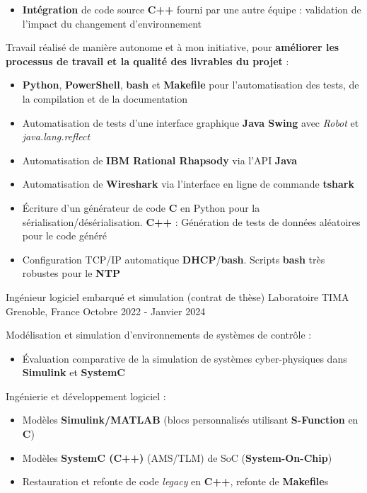 \begin{cventries}
{\begin{cvitems}
{\begin{itemize}
				\item{\textbf{Intégration} de code source \textbf{C++} fourni par une autre équipe : validation de l'impact du changement d'environnement}
			\end{itemize}
		}
		\item{
			Travail réalisé de manière autonome et à mon initiative, pour \textbf{améliorer les processus de travail et la qualité des livrables du projet} :
			\begin{itemize}
				\item{\textbf{Python}, \textbf{PowerShell}, \textbf{bash} et \textbf{Makefile} pour l'automatisation des tests, de la compilation et de la documentation}
				\item{Automatisation de tests d'une interface graphique \textbf{Java Swing} avec \emph{Robot} et \emph{java.lang.reflect}}
				\item{Automatisation de \textbf{IBM Rational Rhapsody} via l'API \textbf{Java}}
				\item{Automatisation de \textbf{Wireshark} via l'interface en ligne de commande \textbf{tshark}}
				\item{Écriture d'un générateur de code \textbf{C} en Python pour la sérialisation/désérialisation. \textbf{C++} : Génération de tests de données aléatoires pour le code généré}	
				\item{Configuration TCP/IP automatique \textbf{DHCP}/\textbf{bash}. Scripts \textbf{bash} très robustes pour le \textbf{NTP}}
			\end{itemize}
		}
		\end{cvitems}
	}

	\cventry
	{Ingénieur logiciel embarqué et simulation (contrat de thèse)} %
	{Laboratoire TIMA} %
	{Grenoble, France} %
	{Octobre 2022 - Janvier 2024} %
	{
		\begin{cvitems} %
		\item{
			Modélisation et simulation d'environnements de systèmes de contrôle :
			\begin{itemize}
				\item{Évaluation comparative de la simulation de systèmes cyber-physiques dans \textbf{Simulink} et \textbf{SystemC}}
			\end{itemize}
		}
		\item{
			Ingénierie et développement logiciel :
			\begin{itemize}
				\item{Modèles \textbf{Simulink/MATLAB} (blocs personnalisés utilisant \textbf{S-Function} en \textbf{C})}
				\item{Modèles \textbf{SystemC (C++)} (AMS/TLM) de SoC (\textbf{System-On-Chip})}
				\item{Restauration et refonte de code \emph{legacy} en \textbf{C++}, refonte de \textbf{Makefile}s}
			\end{itemize}
		}
		\end{cvitems}
	}


\end{cventries}
